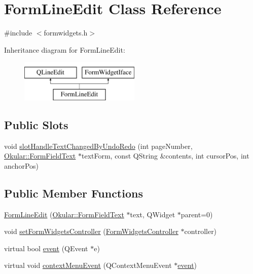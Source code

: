 \hypertarget{classFormLineEdit}{\section{Form\+Line\+Edit Class Reference}
\label{classFormLineEdit}
}


{\ttfamily \#include $<$formwidgets.\+h$>$}

Inheritance diagram for Form\+Line\+Edit\+:\begin{figure}[H]
\begin{center}
\leavevmode
\includegraphics[height=2.000000cm]{classFormLineEdit}
\end{center}
\end{figure}
\subsection*{Public Slots}
\begin{DoxyCompactItemize}
\item 
void \hyperlink{classFormLineEdit_af2acc5534754de3bf25f6aee33708c54}{slot\+Handle\+Text\+Changed\+By\+Undo\+Redo} (int page\+Number, \hyperlink{classOkular_1_1FormFieldText}{Okular\+::\+Form\+Field\+Text} $\ast$text\+Form, const Q\+String \&contents, int cursor\+Pos, int anchor\+Pos)
\end{DoxyCompactItemize}
\subsection*{Public Member Functions}
\begin{DoxyCompactItemize}
\item 
\hyperlink{classFormLineEdit_aaf3fd0009dee6d9ccc9b3c79c7836756}{Form\+Line\+Edit} (\hyperlink{classOkular_1_1FormFieldText}{Okular\+::\+Form\+Field\+Text} $\ast$text, Q\+Widget $\ast$parent=0)
\item 
void \hyperlink{classFormLineEdit_a203b220e22328af4354f6731c7d7d1a9}{set\+Form\+Widgets\+Controller} (\hyperlink{classFormWidgetsController}{Form\+Widgets\+Controller} $\ast$controller)
\item 
virtual bool \hyperlink{classFormLineEdit_aca132b63e01dd644a5557dca87454332}{event} (Q\+Event $\ast$e)
\item 
virtual void \hyperlink{classFormLineEdit_a21fd5d6495df925c8697c2a5432c0318}{context\+Menu\+Event} (Q\+Context\+Menu\+Event $\ast$\hyperlink{classFormLineEdit_aca132b63e01dd644a5557dca87454332}{event})
\end{DoxyCompactItemize}
